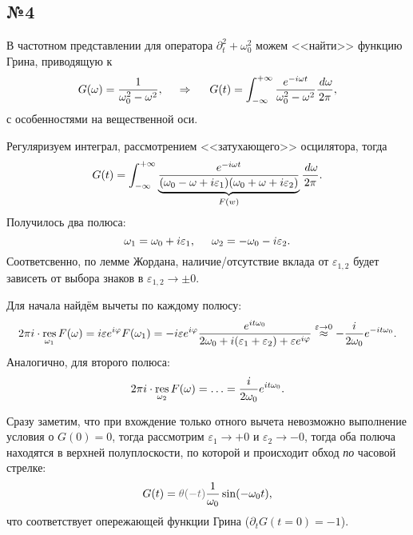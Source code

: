 \subsection*{№4}


В частотном представлении для оператора $\partial_t^2 + \omega_0^2$ можем <<найти>> функцию Грина, приводящую к
\begin{equation*}
    G(\omega) = \frac{1}{\omega_0^2 - \omega^2},
    \hspace{0.5cm} \Rightarrow \hspace{0.5cm}
    G(t) = \int_{-\infty}^{+\infty}  \frac{e^{- i \omega t}}{\omega_0^2 - \omega^2} \frac{\, d \omega}{2\pi},
\end{equation*}
с особенностями на вещественной оси.

Регуляризуем интеграл, рассмотрением <<затухающего>> осцилятора, тогда
\begin{equation*}
    G(t) = \int_{-\infty}^{+\infty} \underbrace{\frac{e^{- i \omega t}}{(\omega_0 - \omega + i \varepsilon_1)(\omega_0 + \omega + i \varepsilon_2)}}_{F(w)} \frac{\, d \omega}{2\pi}.
\end{equation*}
Получилось два полюса:
\begin{equation*}
    \omega_1 = \omega_0 + i \varepsilon_1,
    \hspace{5 mm} 
    \omega_2 = - \omega_0 - i \varepsilon_2.
\end{equation*}
Соответсвенно, по лемме Жордана, наличие/отсутствие вклада от $\varepsilon_{1,2}$ будет зависеть от выбора знаков в $\varepsilon_{1,2} \to \pm 0$. 

Для начала найдём вычеты по каждому полюсу:
\begin{equation*}
    2 \pi i \cdot \mathop{\mathrm{res}}\limits_{\omega_1} F(\omega) = 
    i \varepsilon e^{i \varphi} F(\omega_1) = 
    - i{\varepsilon e^{i \varphi}} \frac{e^{i t \omega_0}}{2 \omega_0 + i (\varepsilon_1 + \varepsilon_2) + \varepsilon e^{i \varphi}} \overset{\varepsilon \to 0}{\approx} 
-\frac{i}{2 \omega_0} e^{- i t \omega_0}.
\end{equation*}
Аналогично, для второго полюса:
\begin{equation*}
    2 \pi i \cdot \mathop{\mathrm{res}}\limits_{\omega_2} F(\omega) =  \ldots = \frac{i}{2 \omega_0} e^{i t \omega_0}.
\end{equation*}

Сразу заметим, что при вхождение только отного вычета невозможно выполнение условия о $G(0) = 0$, тогда рассмотрим $\varepsilon_1 \to + 0$ и $\varepsilon_2 \to - 0$, тогда оба полюча находятся в верхней полуплоскости, по которой и происходит обход \textit{по} часовой стрелке:
\begin{equation*}
    G(t) =  \textcolor{grey}{\theta (-t)} \frac{1}{\omega_0} \sin(- \omega_0 t),
\end{equation*}
что соответствует опережающей функции Грина ($\partial_t G(t=0) = -1$). 

